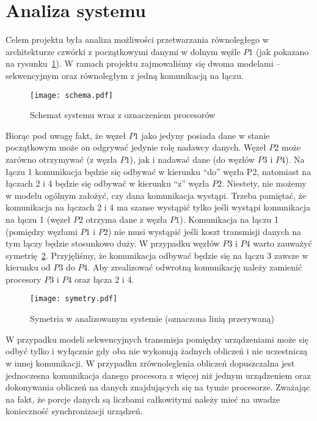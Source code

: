 
\section{Analiza systemu}

Celem projektu była analiza możliwości przetwarzania równoległego w architekturze czwórki z początkowymi danymi w dolnym węźle $P1$
(jak pokazano na rysunku~\ref{fig:schema}).
W ramach projektu zajmowaliśmy się dwoma modelami -- sekwencyjnym oraz równoległym z jedną komunikacją na łączu.

\begin{figure}[!ht]
\centering
\texttt{[image: schema.pdf]}
\caption{Schemat systemu wraz z oznaczeniem procesorów}
\label{fig:schema}
\end{figure}

Biorąc pod uwagę fakt, że węzeł $P1$ jako jedyny  posiada dane w stanie początkowym może on odgrywać jedynie rolę nadawcy danych.
Węzeł $P2$ może zarówno otrzymywać (z węzła $P1$), jak i nadawać dane (do węzłów $P3$ i $P4$). Na łączu 1 komunikacja będzie się odbywać w kierunku “do” węzła P2,
natomiast na łączach 2 i 4 będzie się odbywać w kierunku “z” węzła $P2$. Niestety, nie możemy w modelu ogólnym założyć, czy dana komunikacja wystąpi.
Trzeba pamiętać, że komunikacja na łączach 2 i 4 ma szanse wystąpić tylko jeśli wystąpi komunikacja na łączu 1 (węzeł $P2$ otrzyma dane z węzła $P1$).
Komunikacja na łączu 1 (pomiędzy węzłami $P1$ i $P2$) nie musi wystąpić jeśli koszt transmisji danych na tym łączy będzie stosunkowo duży.
W przypadku węzłów $P3$ i $P4$ warto zauważyć symetrię~\ref{fig:symetry}. Przyjęliśmy, że komunikacja odbywać będzie się na łączu 3 zawsze w kierunku
od $P3$ do $P4$. Aby zrealizować odwrotną komunikację należy zamienić procesory $P3$ i $P4$ oraz łącza 2 i 4.


\begin{figure}[!ht]
\centering
\texttt{[image: symetry.pdf]}
\caption{Symetria w analizowanym systemie (oznaczona linią przerywaną)}
\label{fig:symetry}
\end{figure}

W przypadku modeli sekwencyjnych transmisja pomiędzy urządzeniami może się odbyć tylko i wyłącznie gdy oba nie wykonują żadnych obliczeń i nie uczestniczą w innej komunikacji.
W przypadku zrównoleglenia obliczeń dopuszczalna jest jednoczesna komunikacja danego procesora z więcej niż jednym urządzeniem
oraz dokonywania obliczeń na danych znajdujących się na tymże procesorze.
Zważając na fakt, że porcje danych są liczbami całkowitymi należy mieć na uwadze konieczność synchronizacji urządzeń. \\

